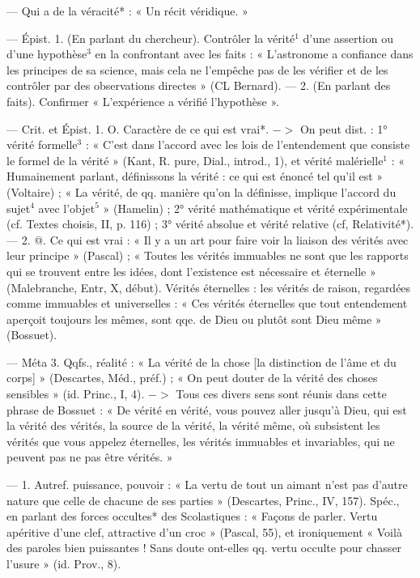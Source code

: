 \begin{itemize}[leftmargin=1cm, label=, itemsep=1pt]
 — Qui a de la véracité* :
« Un récit véridique. »

 — Épist. 1. (En parlant du
chercheur). Contrôler la vérité$^1$ d’une
assertion ou d’une hypothèse$^3$ en
la confrontant avec les faits : « L’astronome a confiance dans les principes de sa science, mais cela ne
l'empêche pas de les vérifier et de
les contrôler par des observations
directes » (CL Bernard). — 2. (En
parlant des faits). Confirmer
« L'expérience a vérifié l’hypothèse ».

 — Crit. et Épist. 1. O. Caractère de ce qui est vrai*. $->$ On
peut dist. : 1° vérité formelle$^3$ :
« C’est dans l’accord avec les lois
de l’entendement que consiste le
formel de la vérité » (Kant, R. pure,
Dial., introd., 1), et vérité malérielle$^1$ : « Humainement parlant,
définissons la vérité : ce qui est
énoncé tel qu'il est » (Voltaire) ;
« La vérité, de qq. manière qu’on la
définisse, implique l'accord du sujet$^4$
avec l’objet$^5$ » (Hamelin) ; 2° vérité
mathématique et vérité expérimentale (cf. Textes choisis, II, p. 116) ;
3° vérité absolue et vérité relative
(cf, Relativité*). — 2. @. Ce qui est
vrai : « Il y a un art pour faire voir
la liaison des vérités avec leur principe » (Pascal) ; « Toutes les vérités
immuables ne sont que les rapports
qui se trouvent entre les idées, dont
l'existence est nécessaire et éternelle » (Malebranche, Entr, X,
début). Vérités éternelles : les vérités
de raison, regardées comme immuables et universelles : « Ces vérités
éternelles que tout entendement
aperçoit toujours les mêmes, sont
qqe. de Dieu ou plutôt sont Dieu
même » (Bossuet).

— Méta 3. Qqfs., réalité : « La
vérité de la chose [la distinction de
l’âme et du corps] » (Descartes,
Méd., préf.) ; « On peut douter de la
vérité des choses sensibles » (id.
Princ., I, 4). $->$ Tous ces divers
sens sont réunis dans cette phrase
de Bossuet : « De vérité en vérité,
vous pouvez aller jusqu'à Dieu,
qui est la vérité des vérités, la source
de la vérité, la vérité même, où subsistent les vérités que vous appelez
éternelles, les vérités immuables et
invariables, qui ne peuvent pas ne
pas être vérités. »

 — 1. Autref. puissance, pouvoir : « La vertu de tout un aimant
n’est pas d’autre nature que celle de
chacune de ses parties » (Descartes,
Princ., IV, 157). Spéc., en parlant
des forces occultes* des Scolastiques :
« Façons de parler. Vertu apéritive
d'une clef, attractive d'un croc »
(Pascal, 55), et ironiquement
« Voilà des paroles bien puissantes !
Sans doute ont-elles qq. vertu
occulte pour chasser l'usure » (id.
Prov., 8).


\end{itemize}
